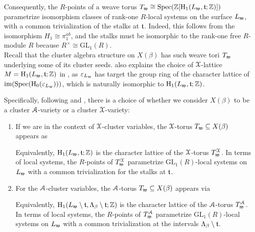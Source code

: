 \noindent Consequently, \color{blue}the $R$-points of a weave torus $T_\w\cong \Spec(\Z[\hH_1(L_\w,\tt;\Z)])$ parametrize isomorphism classes of rank-one $R$-local systems on the surface $L_\w$, with a common trivialization of the stalks at $\tt$\color{black}. Indeed, this follows from the isomorphism $H_1\cong \pi_1^{ab}$, and the stalks must be isomorphic to the rank-one free $R$-module $R$ because $R^\times\cong\mbox{GL}_1(R)$.\\

Recall that the cluster algebra structure on $X(\beta)$ has such weave tori $T_\w$ underlying some of its cluster seeds.  also explains the choice of $\SX$-lattice $M=\hH_1(L_\w,\tt;\Z)$ in , as $\varepsilon_{L_\w}$ has target the group ring of the character lattice of $\operatorname{im}(\Spec(\hH_0(\varepsilon_{L_\w})))$, which is naturally isomorphic to $\hH_1(L_\w,\tt;\Z)$.\\

\begin{center}
\end{center}
\vspace{0.2cm}
\noindent Specifically, following  and , there is a choice of whether we consider $X(\beta)$ to be a cluster $\SA$-variety or a cluster $\SX$-variety:

\begin{enumerate}
    \item If we are in the context of $\SX$-cluster variables, the $\SX$-torus $T_\w\sse X(\beta)$ appears as
    \begin{center}
    \end{center}
    \noindent Equivalently, $\hH_1(L_\w,\tt;\Z)$ is the character lattice of the $\SX$-torus $T_\w^\SX$. In terms of local systems, the $R$-points of $T^\SX_\w$ parametrize $\mbox{GL}_1(R)$-local systems on $L_\w$ with a common trivialization for the stalks at $\tt$.\\
    
    \item For the $\SA$-cluster variables, the $\SA$-torus $T_\w\sse X(\beta)$ appears via
     \begin{center}
    \end{center}
    \noindent Equivalently, $\hH_1(L_\w\setminus \tt,\La_\beta\setminus \tt;\Z)$ is the character lattice of the $\SA$-torus $T_\w^\SA$. In terms of local systems, the $R$-points of $T^\SA_\w$ parametrize $\mbox{GL}_1(R)$-local systems on $L_\w$ with a common trivialization at the intervals $\La_\beta\setminus \tt$.\\
\end{enumerate}

